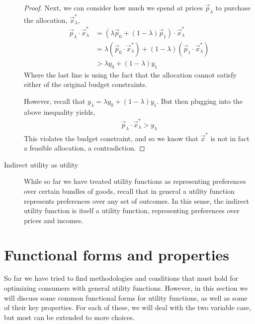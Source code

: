 \begin{description}
\begin{proof}
        Next, we can consider how much we spend at prices $\vec{p}_\lambda$ to purchase the allocation, $\vec{x}^*_\lambda$,
        \begin{align*}
            \vec{p}_\lambda \cdot \vec{x}^*_\lambda &= (\lambda \vec{p}_0 + (1 - \lambda) \vec{p}_1) \cdot \vec{x}^*_\lambda \\
            &= \lambda (\vec{p}_0 \cdot \vec{x}^*_\lambda) + (1 - \lambda) (\vec{p}_1 \cdot \vec{x}^*_\lambda) \\
            &> \lambda y_0 + (1 - \lambda) y_1
        \end{align*}
        Where the last line is using the fact that the allocation cannot satisfy either of the original budget constraints. 

        However, recall that $y_\lambda = \lambda y_0 + (1 - \lambda)y_1$. But then plugging into the above inequality yields,
        \begin{align*}
            \vec{p}_\lambda \cdot \vec{x}^*_\lambda > y_\lambda
        \end{align*}
        This violates the budget constraint, and so we know that $\vec{x}^*$ is not in fact a feasible allocation, a contradiction. 
    \end{proof}
    \item[Indirect utility as utility] While so far we have treated utility functions as representing preferences over certain bundles of goods, recall that in general a utility function represents preferences over any set of outcomes. In this sense, the indirect utility function is itself a utility function, representing preferences over prices and incomes. 
\end{description}

\section{Functional forms and properties}
So far we have tried to find methodologies and conditions that must hold for optimizing consumers with general utility functions. However, in this section we will discuss some common functional forms for utility functions, as well as some of their key properties. For each of these, we will deal with the two variable case, but most can be extended to more choices. 

